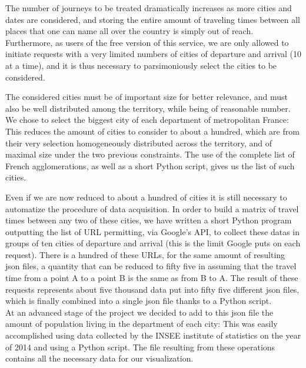 \documentclass{vgtc}                          %
\begin{document}


The number of journeys to be treated dramatically increases as more cities and dates are considered, and storing the entire amount of traveling times between all places that one can name all over the country is simply out of reach. Furthermore, as users of the free version of this service, we are only allowed to initiate requests with a very limited numbers of cities of departure and arrival (10 at a time), and it is thus necessary to parsimoniously select the cities to be considered. 


The considered cities must be of important size for better relevance, and must also be well distributed among the territory, while being of reasonable number. We chose to select the biggest city of each department of metropolitan France: This reduces the amount of cities to consider to about a hundred, which are from their very selection homogeneously distributed across the territory, and of maximal size under the two previous constraints. The use of the complete list of French agglomerations, as well as a short Python script, gives us the list of such cities.

Even if we are now reduced to about a hundred of cities it is still necessary to automatize the procedure of data acquisition. In order to build a matrix of travel times between any two of these cities, we have written a short Python program outputting the list of URL permitting, via Google's API, to collect these datas in groups of ten cities of departure and arrival (this is the limit Google puts on each request). There is a hundred of these URLs, for the same amount of resulting json files, a quantity that can be reduced to fifty five in assuming that the travel time from a point A to a point B is the same as from B to A. The result of these requests represents about five thousand data put into fifty five different json files, which is finally combined into a single json file thanks to a Python script.\\ 

At an advanced stage of the project we decided to add to this json file the amount of population living in the department of each city: This was easily accomplished using data collected by the INSEE institute of statistics on the year of 2014 \cite{INSEE} and using a Python script. The file resulting from these operations contains all the necessary data for our visualization. 
\end{document}
